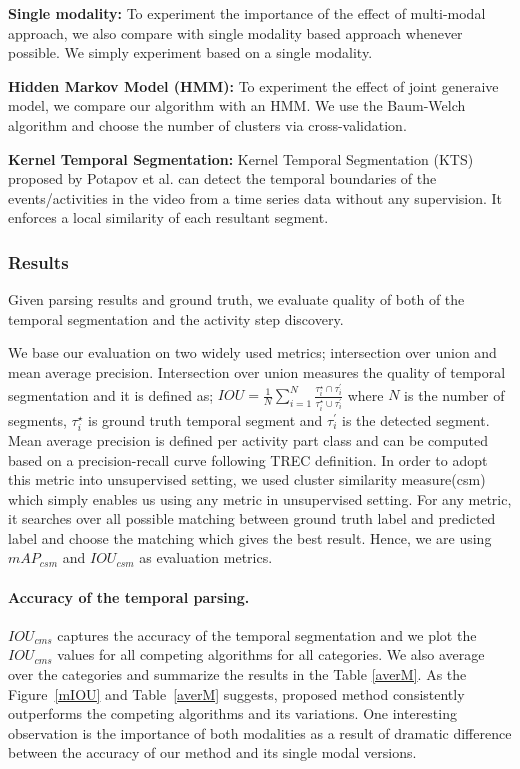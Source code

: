 \noindent\textbf{Single modality:}
To experiment the importance of the effect of multi-modal approach, we also compare with single modality based approach whenever possible. We simply experiment based on a single modality.

\noindent\textbf{Hidden Markov Model (HMM):}
To experiment the effect of joint generaive model, we compare our algorithm with an HMM. We use the Baum-Welch algorithm\cite{rabiner} and choose the number of clusters via cross-validation.


\noindent\textbf{Kernel Temporal Segmentation\cite{potapov2014category}:}
Kernel Temporal Segmentation (KTS) proposed by Potapov et al.\cite{potapov2014category} can detect the temporal boundaries of the events/activities in the video from a time series data without any supervision. It enforces a local similarity of each resultant segment.

\subsubsection{Results}
Given parsing results and ground truth, we evaluate quality of both of the temporal segmentation and the activity step discovery. 

We base our evaluation on two widely used metrics; intersection over union and mean average precision. Intersection over union measures the quality of temporal segmentation and it is defined as; $IOU=\frac{1}{N}\sum_{i=1}^N \frac{\tau^\star_i \cap \tau^\prime_{i}}{\tau^\star_i \cup \tau^\prime_{i}}$ where $N$ is the number of segments, $\tau^\star_i$ is ground truth temporal segment and $\tau^\prime_{i}$ is the detected segment. Mean average precision is defined per activity part class and can be computed based on a precision-recall curve following TREC\cite{trecc} definition. In order to adopt this metric into unsupervised setting, we used cluster similarity measure(csm)\cite{liao05} which simply enables us using any metric in unsupervised setting. For any metric, it searches over all possible matching between ground truth label and predicted label and choose the matching which gives the best result. Hence, we are using $mAP_{csm}$ and $IOU_{csm}$ as evaluation metrics.


\paragraph{Accuracy of the temporal parsing.}
$IOU_{cms}$ captures the accuracy of the temporal segmentation and we plot the $IOU_{cms}$ values for all competing algorithms for all categories. We also average over the categories and summarize the results in the Table \ref{averM}. As the Figure~\ref{mIOU} and Table~\ref{averM} suggests, proposed method consistently outperforms the competing algorithms and its variations. One interesting observation is the importance of both modalities as a result of dramatic difference between the accuracy of our method and its single modal versions.

